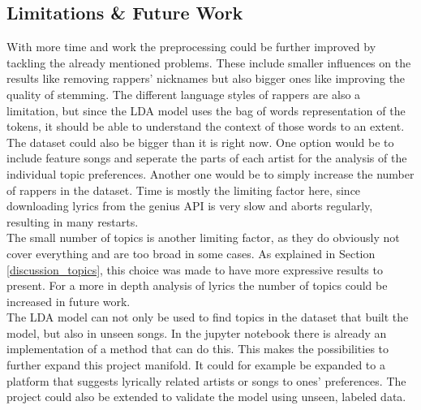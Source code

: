 \documentclass[conference]{IEEEtran}
\begin{document}
\subsection{Limitations \& Future Work}
With more time and work the preprocessing could be further improved by tackling the already mentioned problems. These include smaller influences on the results like removing rappers' nicknames but also bigger ones like improving the quality of stemming. The different language styles of rappers are also a limitation, but since the LDA model uses the bag of words representation of the tokens, it should be able to understand the context of those words to an extent. The dataset could also be bigger than it is right now. One option would be to include feature songs and seperate the parts of each artist for the analysis of the individual topic preferences. Another one would be to simply increase the number of rappers in the dataset. Time is mostly the limiting factor here, since downloading lyrics from the genius API is very slow and aborts regularly, resulting in many restarts.\\
The small number of topics is another limiting factor, as they do obviously not cover everything and are too broad in some cases. As explained in Section \ref{discussion_topics}, this choice was made to have more expressive results to present. For a more in depth analysis of lyrics the number of topics could be increased in future work.\\
The LDA model can not only be used to find topics in the dataset that built the model, but also in unseen songs. In the jupyter notebook there is already an implementation of a method that can do this. This makes the possibilities to further expand this project manifold. It could for example be expanded to a platform that suggests lyrically related artists or songs to ones' preferences. The project could also be extended to validate the model using unseen, labeled data.
\end{document}
